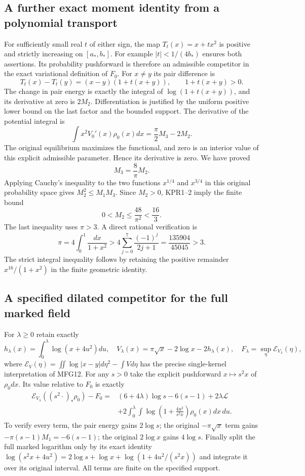 \documentclass[11pt,a4paper]{article}
\begin{document}
\subsection{A further exact moment identity from a polynomial transport}
For sufficiently small real $t$ of either sign, the map
$T_t(x)=x+tx^2$ is positive and strictly increasing on $[a_*,b_*]$.
For example $|t|<1/(4b_*)$ ensures both assertions. Its probability
pushforward is therefore an admissible competitor in the exact
variational definition of $F_0$. For $x\ne y$ its pair difference is
\[
 T_t(x)-T_t(y)=(x-y)(1+t(x+y)),\qquad 1+t(x+y)>0.
\]
The change in pair energy is exactly the integral of
$\log(1+t(x+y))$, and its derivative at zero is $2M_2$.
Differentiation is justified by the uniform positive lower bound on
the last factor and the bounded support. The derivative of the
potential integral is
\[
 \int x^2V_0'(x)\rho_0(x)dx
       =\frac\pi2M_3-2M_2.
\]
The original equilibrium maximizes the functional, and zero is an
interior value of this explicit admissible parameter. Hence its
derivative is zero. We have proved
\[
 \boxed{M_3=\frac8\pi M_2.}
 \tag{KPR2}
\]
Applying Cauchy's inequality to the two functions $x^{1/4}$ and
$x^{3/4}$ in this original probability space gives
$M_2^2\leq M_1M_3$. Since $M_2>0$, KPR1--2 imply the finite bound
\[
 \boxed{0<M_2\leq\frac{48}{\pi^2}<\frac{16}{3}.}
 \tag{KPR3}
\]
The last inequality uses $\pi>3$. A direct rational verification is
\[
 \pi=4\int_0^1\frac{dx}{1+x^2}
 >4\sum_{j=0}^{7}\frac{(-1)^j}{2j+1}
 =\frac{135904}{45045}>3.
\]
The strict integral inequality follows by retaining the positive
remainder $x^{16}/(1+x^2)$ in the finite geometric identity.

\subsection{A specified dilated competitor for the full marked field}
For $\lambda\geq0$ retain exactly
\[
 h_\lambda(x)=\int_0^\lambda\log(x+4u^2)du,
 \quad V_\lambda(x)=\pi\sqrt x-2\log x-2h_\lambda(x),
 \quad F_\lambda=\sup_\eta\mathcal E_{V_\lambda}(\eta),
 \tag{KPR4}
\]
where $\mathcal E_V(\eta)=\iint\log|x-y|d\eta^2-\int Vd\eta$
has the precise single-kernel interpretation of MFG12.
For any $s>0$ take the explicit pushforward $x\mapsto s^2x$ of
$\rho_0dx$. Its value relative to $F_0$ is exactly
\[
 \begin{split}
 \mathcal E_{V_\lambda}((s^2\cdot)_*\rho_0)-F_0
 ={}&(6+4\lambda)\log s-6(s-1)+2\lambda\mathcal L\\
 &+2\int_0^\lambda\int
       \log\left(1+\frac{4u^2}{s^2x}\right)\rho_0(x)dx\,du.
 \end{split}
 \tag{KPR5}
\]
To verify every term, the pair energy gains $2\log s$;
the original $-\pi\sqrt x$ term gains $-\pi(s-1)M_1=-6(s-1)$;
the original $2\log x$ gains $4\log s$.
Finally split the full marked logarithm only by its exact identity
$\log(s^2x+4u^2)=2\log s+\log x+
\log(1+4u^2/(s^2x))$ and integrate it over its original interval.
All terms are finite on the specified support.
\end{document}
